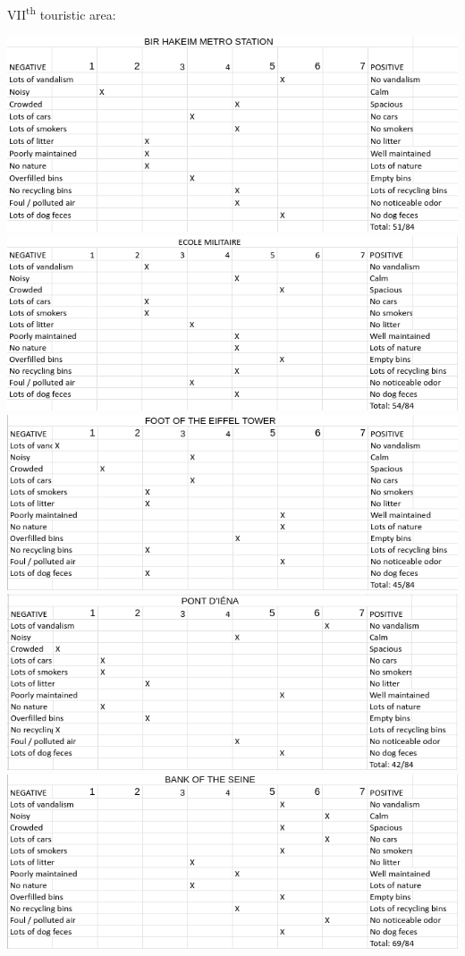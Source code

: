 \documentclass[11pt,letterpaper]{article}
\begin{document}
VII\textsuperscript{th} touristic area:

\includegraphics[width=0.5\linewidth]{media/bipolar/birhakeim.png}
\includegraphics[width=0.5\linewidth]{media/bipolar/ecolemilitaire.png}
\includegraphics[width=0.5\linewidth]{media/bipolar/eiffel.png}
\includegraphics[width=0.5\linewidth]{media/bipolar/iena.png}
\includegraphics[width=0.5\linewidth]{media/bipolar/seinebank.png}
\end{document}
